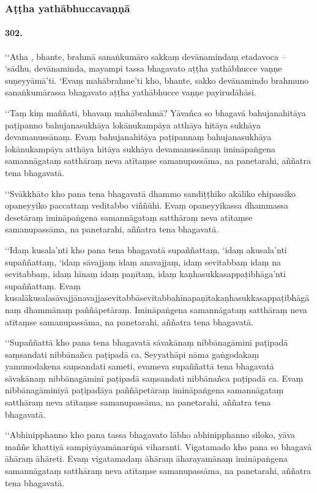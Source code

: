 \subsubsection{Aṭṭha yathābhuccavaṇṇā}

\paragraph{302.} ‘‘Atha , bhante, brahmā sanaṅkumāro sakkaṃ devānamindaṃ etadavoca – ‘sādhu, devānaminda, mayampi tassa bhagavato aṭṭha yathābhucce vaṇṇe suṇeyyāmā’ti. ‘Evaṃ mahābrahme’ti kho, bhante, sakko devānamindo brahmuno sanaṅkumārassa bhagavato aṭṭha yathābhucce vaṇṇe payirudāhāsi.

‘‘Taṃ kiṃ maññati, bhavaṃ mahābrahmā? Yāvañca so bhagavā bahujanahitāya paṭipanno bahujanasukhāya lokānukampāya atthāya hitāya sukhāya devamanussānaṃ. Evaṃ bahujanahitāya paṭipannaṃ bahujanasukhāya lokānukampāya atthāya hitāya sukhāya devamanussānaṃ imināpaṅgena samannāgataṃ satthāraṃ neva atītaṃse samanupassāma, na panetarahi, aññatra tena bhagavatā.

‘‘Svākkhāto kho pana tena bhagavatā dhammo sandiṭṭhiko akāliko ehipassiko opaneyyiko paccattaṃ veditabbo viññūhi. Evaṃ opaneyyikassa dhammassa desetāraṃ imināpaṅgena samannāgataṃ satthāraṃ neva atītaṃse samanupassāma, na panetarahi, aññatra tena bhagavatā.

‘‘Idaṃ kusala’nti kho pana tena bhagavatā supaññattaṃ, ‘idaṃ akusala’nti supaññattaṃ, ‘idaṃ sāvajjaṃ idaṃ anavajjaṃ, idaṃ sevitabbaṃ idaṃ na sevitabbaṃ, idaṃ hīnaṃ idaṃ paṇītaṃ, idaṃ kaṇhasukkasappaṭibhāga’nti supaññattaṃ. Evaṃ kusalākusalasāvajjānavajjasevitabbāsevitabbahīnapaṇītakaṇhasukkasappaṭibhāgānaṃ dhammānaṃ paññāpetāraṃ. Imināpaṅgena samannāgataṃ satthāraṃ neva atītaṃse samanupassāma, na panetarahi, aññatra tena bhagavatā.

‘‘Supaññattā kho pana tena bhagavatā sāvakānaṃ nibbānagāminī paṭipadā saṃsandati nibbānañca paṭipadā ca. Seyyathāpi nāma gaṅgodakaṃ yamunodakena saṃsandati sameti, evameva supaññattā tena bhagavatā sāvakānaṃ nibbānagāminī paṭipadā saṃsandati nibbānañca paṭipadā ca. Evaṃ nibbānagāminiyā paṭipadāya paññāpetāraṃ imināpaṅgena samannāgataṃ satthāraṃ neva atītaṃse samanupassāma, na panetarahi, aññatra tena bhagavatā.

‘‘Abhinipphanno kho pana tassa bhagavato lābho abhinipphanno siloko, yāva maññe khattiyā sampiyāyamānarūpā viharanti. Vigatamado kho pana so bhagavā āhāraṃ āhāreti. Evaṃ vigatamadaṃ āhāraṃ āharayamānaṃ imināpaṅgena samannāgataṃ satthāraṃ neva atītaṃse samanupassāma, na panetarahi, aññatra tena bhagavatā.


